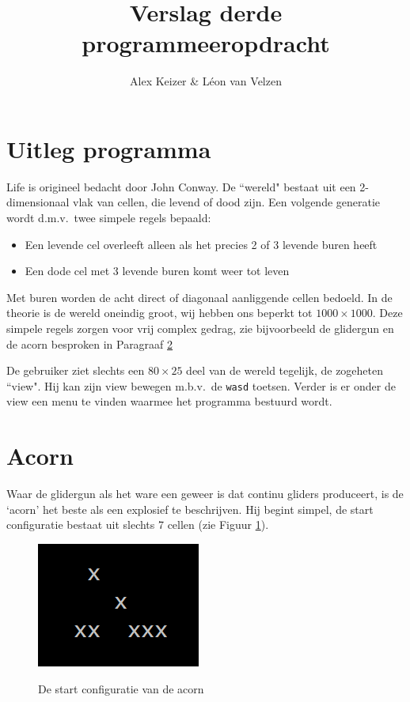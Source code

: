 \documentclass[10pt]{article}
\title{Verslag derde programmeeropdracht}
\author{Alex Keizer \& L\'{e}on van Velzen}
\begin{document}
\maketitle
\section{Uitleg programma}

Life is origineel bedacht door John Conway. De ``wereld" bestaat uit een 2-dimensionaal vlak van cellen, die levend of dood zijn. Een volgende generatie wordt d.m.v.\ twee simpele regels bepaald:
\begin{itemize}
\item Een levende cel overleeft alleen als het precies 2 of 3 levende buren heeft
\item Een dode cel met 3 levende buren komt weer tot leven
\end{itemize}
Met buren worden de acht direct of diagonaal aanliggende cellen bedoeld. In de theorie is de wereld oneindig groot, wij hebben ons beperkt tot $1000 \times 1000$. Deze simpele regels zorgen voor vrij complex gedrag, zie bijvoorbeeld de glidergun\cite{glidergun} en de acorn besproken in Paragraaf \ref{sec:acorn}

De gebruiker ziet slechts een $80 \times 25$ deel van de wereld tegelijk, de zogeheten ``view". Hij kan zijn view bewegen m.b.v.\ de \verb+wasd+ toetsen. Verder is er onder de view een menu te vinden waarmee het programma bestuurd wordt.

\section{Acorn}\label{sec:acorn}

Waar de glidergun als het ware een geweer is dat continu gliders produceert, is de `acorn'\cite{acorn} het beste als een explosief te beschrijven. Hij begint simpel, de start configuratie bestaat uit slechts 7 cellen (zie Figuur \ref{fig:gen0}). 

\begin{figure}[!ht]
\begin{center}
{\includegraphics[scale=0.5]{gen0.png}}
\caption{De start configuratie van de acorn}\label{fig:gen0}
\end{center}
\end{figure}
\end{document}
